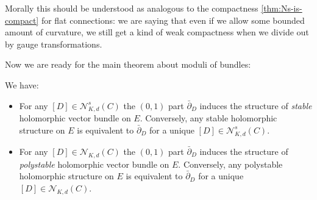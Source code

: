 \documentclass[12pt,letterpaper,reqno]{article}
\numberwithin{equation}{section}
\newcommand{\cN}{\ensuremath{\mathcal N}}
\newcommand{\ti}[1]{\textit{#1}}
\begin{document}
Morally this should be understood as analogous to the compactness
\autoref{thm:Ns-is-compact} for flat connections: we are saying that
even if we allow some bounded amount of curvature, we still get a
kind of weak compactness when we divide out by gauge transformations.


Now we are ready for the main theorem about moduli of bundles:

\begin{thm}  \label{thm:narasimhan-seshadri}
\cite{MR32:1725}
We have:
\begin{itemize}
\item For any $[D] \in \cN^s_{K,d}(C)$ the $(0,1)$ part $\bar\partial_D$
induces the structure of \ti{stable} holomorphic vector bundle on $E$.
Conversely, any stable holomorphic structure
on $E$ is equivalent to $\bar\partial_D$ for a unique $[D] \in \cN^s_{K,d}(C)$.
\item For any $[D] \in \cN_{K,d}(C)$ the $(0,1)$ part $\bar\partial_D$
induces the structure of \ti{polystable} holomorphic vector bundle on $E$.
Conversely, any polystable holomorphic structure
on $E$ is equivalent to $\bar\partial_D$ for a unique $[D] \in \cN_{K,d}(C)$.
\end{itemize}
\end{thm}
\end{document}
